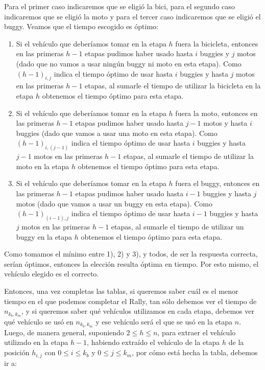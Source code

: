 \begin{itemize}
\begin{itemize}
\begin{enumerate}
		\end{enumerate} 
		Para el primer caso indicaremos que se eligió la bici, para el segundo caso indicaremos que se eligió la moto y para el tercer caso indicaremos que se eligió el buggy. Veamos que el tiempo escogido es óptimo:
		\begin{enumerate}
			\item Si el vehículo que deberíamos tomar en la etapa $h$ fuera la bicicleta, entonces en las primeras $h-1$ etapas pudimos haber usado hasta $i$ buggies y $j$ motos (dado que no vamos a usar ningún buggy ni moto en esta etapa).  Como $(h-1)_{i,j}$ indica el tiempo óptimo de usar hasta $i$ buggies y hasta $j$ motos en las primeras $h-1$ etapas, al sumarle el tiempo de utilizar la bicicleta en la etapa $h$ obtenemos el tiempo óptimo para esta etapa.
			\item Si el vehículo que deberíamos tomar en la etapa $h$ fuera la moto, entonces en las primeras $h-1$ etapas pudimos haber usado hasta $j-1$ motos y hasta $i$ buggies (dado que vamos a usar una moto en esta etapa).  Como $(h-1)_{i,(j-1)}$ indica el tiempo óptimo de usar hasta $i$ buggies y hasta $j-1$ motos en las primeras $h-1$ etapas, al sumarle el tiempo de utilizar la moto en la etapa $h$ obtenemos el tiempo óptimo para esta etapa.
			\item Si el vehículo que deberíamos tomar en la etapa $h$ fuera el buggy, entonces en las primeras $h-1$ etapas pudimos haber usado hasta $i-1$ buggies y hasta $j$ motos (dado que vamos a usar un buggy en esta etapa).  Como $(h-1)_{(i-1),j}$ indica el tiempo óptimo de usar hasta $i-1$ buggies y hasta $j$ motos en las primeras $h-1$ etapas, al sumarle el tiempo de utilizar un buggy en la etapa $h$ obtenemos el tiempo óptimo para esta etapa.
		\end{enumerate}
		Como tomamos el mínimo entre 1), 2) y 3), y todos, de ser la respuesta correcta, serían óptimos, entonces la elección resulta óptima en tiempo. Por esto mismo, el vehículo elegido es el correcto.
	\end{itemize}
\end{itemize}

	Entonces, una vez completas las tablas, si queremos saber cuál es el menor tiempo en el que podemos completar el Rally, tan sólo debemos ver el tiempo de $n_{k_{b},k_{m}}$, y si queremos saber qué vehículos utilizamos en cada etapa, debemos ver qué vehículo se usó en $n_{k_{b},k_{m}}$ y ese vehículo será el que se usó en la etapa $n$. Luego, de manera general, suponiendo $2 \leq h \leq n$, para extraer el vehículo utilizado en la etapa $h-1$, habiendo extraído el vehículo de la etapa $h$ de la posición $h_{i,j}$ con $0\leq i \leq k_{b}$ y $0\leq j \leq k_{m}$, por cómo está hecha la tabla, debemos ir a:
	
